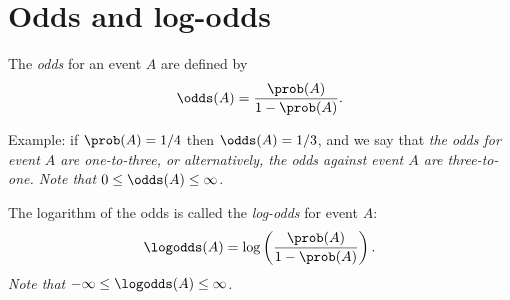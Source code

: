 %
%
%


\section{Odds and log-odds}
The \emph{odds} for an event $A$ are defined by
\[
\odds(A) = \frac{\prob(A)}{1-\prob(A)}.%
\]

\vspace*{2ex}
Example: if $\prob(A)=1/4$ then $\odds(A)=1/3$, and we say that
\bit 
\it the odds \emph{for} event $A$ are \emph{one-to-three}, or alternatively,
\it the odds \emph{against} event $A$ are \emph{three-to-one}.
\it Note that $0\leq\odds(A) \leq \infty$.
\eit


The logarithm of the odds is called the \emph{log-odds} for event $A$:
\[
\logodds(A) = \log\left(\frac{\prob(A)}{1-\prob(A)}\right).%
\]
\bit
\it Note that $-\infty\leq\logodds(A)\leq\infty$.
\eit



